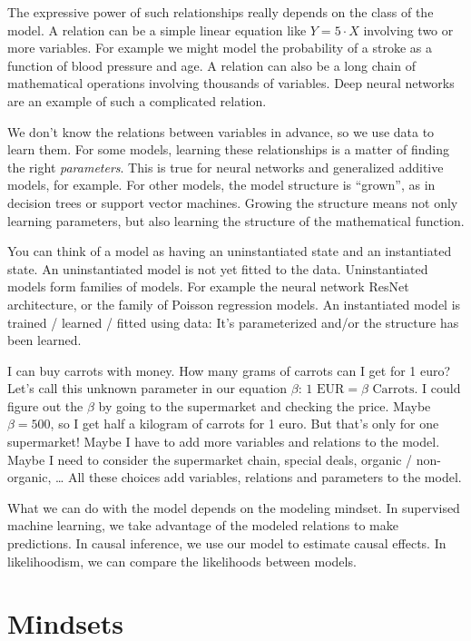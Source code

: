 \documentclass[
  10pt,
]{scrbook}
\begin{document}
The expressive power of such relationships really depends on the class of the model.
A relation can be a simple linear equation like \(Y = 5 \cdot X\) involving two or more variables.
For example we might model the probability of a stroke as a function of blood pressure and age.
A relation can also be a long chain of mathematical operations involving thousands of variables.
Deep neural networks are an example of such a complicated relation.

We don't know the relations between variables in advance, so we use data to learn them.
For some models, learning these relationships is a matter of finding the right \emph{parameters}.
This is true for neural networks and generalized additive models, for example.
For other models, the model structure is ``grown'', as in decision trees or support vector machines.
Growing the structure means not only learning parameters, but also learning the structure of the mathematical function.

You can think of a model as having an uninstantiated state and an instantiated state.
An uninstantiated model is not yet fitted to the data.
Uninstantiated models form families of models.
For example the neural network ResNet architecture, or the family of Poisson regression models.
An instantiated model is trained / learned / fitted using data: It's parameterized and/or the structure has been learned.

I can buy carrots with money.
How many grams of carrots can I get for 1 euro?
Let's call this unknown parameter in our equation \(\beta\):
\(1 \text{ EUR} = \beta \text{ Carrots}\).
I could figure out the \(\beta\) by going to the supermarket and checking the price.
Maybe \(\beta = 500\), so I get half a kilogram of carrots for 1 euro.
But that's only for one supermarket!
Maybe I have to add more variables and relations to the model.
Maybe I need to consider the supermarket chain, special deals, organic / non-organic, \ldots{}
All these choices add variables, relations and parameters to the model.

What we can do with the model depends on the modeling mindset.
In supervised machine learning, we take advantage of the modeled relations to make predictions.
In causal inference, we use our model to estimate causal effects.
In likelihoodism, we can compare the likelihoods between models.

\hypertarget{mindsets}{%
\chapter{Mindsets}\label{mindsets}}
\end{document}
